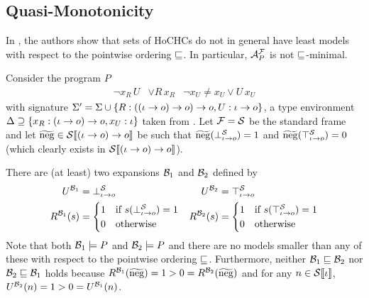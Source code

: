 \documentclass[a4paper,twoside,notitlepage,openright,11pt]{report}
\begin{document}
\subsection{Quasi-Monotonicity}
\label{sec:quasi-mon}
\label{SEC:QUASI-MON}
In \cite{BOR18}, the authors show that sets of HoCHCs do not in general have least models with respect to the pointwise ordering $\sqsubseteq$. In particular, $\mathcal A^\mathcal F_P$ is not $\sqsubseteq$-minimal. 
  \begin{example}
    \label{ex:notminmod}
    Consider the program $P$
    \begin{align*}
      \neg x_R\,U&\lor R\,x_R& \neg x_U\neq x_U\lor U\,x_U
    \end{align*}
    with signature $\Sigma'=\Sigma\cup\{R:((\iota\to o)\to o)\to o,U:\iota\to o\}$, a type environment $\Delta\supseteq\{x_R:(\iota\to o)\to o,x_U:\iota\}$ taken from \cite{BOR18}. Let $\mathcal F=\mathcal S$ be the standard frame and let $\widetilde{\operatorname{neg}}\in{\mathcal S}\llbracket(\iota\to o)\to o\rrbracket$ be such that $\widetilde{\operatorname{neg}}(\bot^\mathcal S_{\iota\to o})=1$ and $\widetilde{\operatorname{neg}}(\top^\mathcal S_{\iota\to o})=0$ (which clearly exists in ${\mathcal S}\llbracket(\iota\to o)\to o\rrbracket$).

    There are (at least) two expansions $\mathcal B_1$ and $\mathcal B_2$ defined by
    \begin{align*}
      U^{\mathcal B_1}&=\bot^\mathcal S_{\iota\to o}&U^{\mathcal B_2}&=\top^\mathcal S_{\iota\to o}\\
      R^{\mathcal B_1}(s)&=
                    \begin{cases}
                      1&\text{if }s(\bot^\mathcal S_{\iota\to o})=1 \\
                      0&\text{otherwise}
                    \end{cases}&
                                 R^{\mathcal B_2}(s)&=
                                               \begin{cases}
                                                 1&\text{if }s(\top^\mathcal S_{\iota\to o})=1 \\
                                                 0&\text{otherwise}
                                               \end{cases}
    \end{align*}
    Note that both $\mathcal B_1\models P$ and $\mathcal B_2\models P$ and there are no models smaller than any of these with respect to the pointwise ordering $\sqsubseteq$. Furthermore, neither $\mathcal B_1\sqsubseteq\mathcal B_2$ nor $\mathcal B_2\sqsubseteq\mathcal B_1$ holds because $R^{\mathcal B_1}(\widetilde{\operatorname{neg}})=1>0=R^{\mathcal B_2}(\widetilde{\operatorname{neg}})$ and for any $n\in{\mathcal S}\llbracket\iota\rrbracket$, $U^{\mathcal B_2}(n)=1>0=U^{\mathcal B_1}(n)$.
  \end{example}
\end{document}
